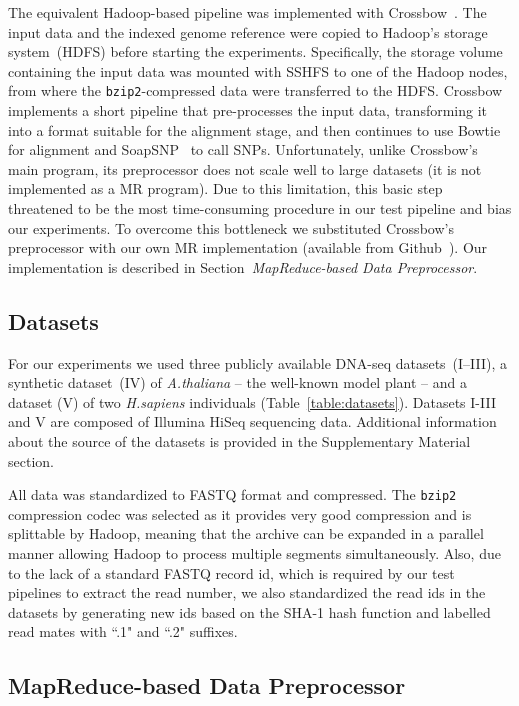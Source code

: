 \documentclass[10pt]{article}
\begin{document}
The equivalent Hadoop-based pipeline was implemented with Crossbow~\cite{Langmead:2009kx}. The input
data and the indexed genome reference were copied to Hadoop's storage
system~(HDFS) before starting the experiments.  Specifically, the storage volume
containing the input data was mounted with SSHFS to one of the Hadoop nodes,
from where the \texttt{bzip2}-compressed data were transferred to the HDFS.
Crossbow implements a short pipeline that pre-processes the input data, transforming it into a format suitable for the alignment stage, and then continues to use Bowtie for alignment and SoapSNP~\cite{soapsnp} to call SNPs.  Unfortunately, unlike Crossbow's main program, its preprocessor does not scale well to large datasets (it is not implemented as a MR program). Due to this limitation, this basic step threatened to be the most time-consuming procedure in our test pipeline and bias our experiments. To overcome this bottleneck we substituted Crossbow's preprocessor with our own MR implementation (available from Github~\cite{code_repo_mr}). Our implementation is described in Section~{\it MapReduce-based Data Preprocessor}.


\subsection*{Datasets}
For our experiments we used three publicly available DNA-seq datasets~(I--III),
a synthetic dataset~(IV) of {\it A.thaliana} -- the well-known model plant --
and a dataset (V) of two {\it H.sapiens} individuals
(Table~\ref{table:datasets}). Datasets I-III and V are composed of Illumina
HiSeq sequencing data. Additional information about the source of the datasets is
provided in the Supplementary Material section.

All data was standardized to FASTQ format and compressed. The
\texttt{bzip2} compression codec was selected as it provides very good compression
and is splittable by Hadoop, meaning that the archive can be expanded in a
parallel manner allowing Hadoop to process multiple segments simultaneously.
Also, due to the lack of a standard FASTQ record id, which is
required by our test pipelines to extract the read number, we also standardized
the read ids in the datasets by generating new ids based on the SHA-1 hash
function and labelled read mates with ``.1" and ``.2" suffixes.

\subsection*{MapReduce-based Data Preprocessor}
\label{sec:preprocessor}
\end{document}
